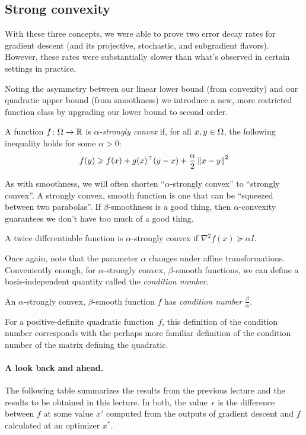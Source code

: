 \subsection{Strong convexity}

With these three concepts, we were able to prove two error decay rates for
gradient descent (and its projective, stochastic, and subgradient flavors).
However, these rates were substantially slower than what's observed in certain
settings in practice.

Noting the asymmetry between our linear lower bound (from convexity) and our
quadratic upper bound (from smoothness) we introduce a new, more restricted
function class by upgrading our lower bound to second order.

\begin{definition}
A function $f\colon\Omega\to\mathbb{R}$
is \emph{$\alpha$-strongly convex}
if, for all $x,y\in\Omega$,
the following inequality holds
for some $\alpha>0$:
\[
f(y) \geqslant f(x) + g(x)^\top(y-x) + \frac{\alpha}{2}\left\lVert x-y\right\rVert^2
\]
\end{definition}

As with smoothness, we will often shorten ``$\alpha$-strongly convex'' to
``strongly convex''.  A strongly convex, smooth function is one that can be
``squeezed between two parabolas''.  If $\beta$-smoothness is a good thing, then
$\alpha$-convexity guarantees we don't have too much of a good thing.

A twice differentiable function is $\alpha$-strongly convex if $\nabla^2f(x)
\succeq \alpha I$.

Once again, note that the parameter $\alpha$ changes under affine
transformations.  Conveniently enough, for $\alpha$-strongly convex,
$\beta$-smooth functions, we can define a basis-independent quantity called the
\emph{condition number}.

\begin{definition}
An $\alpha$-strongly convex, $\beta$-smooth function $f$
has \emph{condition number} $\frac{\beta}{\alpha}$.
\end{definition}

For a positive-definite quadratic function~$f$, this definition of the condition
number corresponds with the perhaps more familiar definition of the condition
number of the matrix defining the quadratic.

\paragraph{A look back and ahead.}
%
The following table summarizes the results from the previous lecture and the
results to be obtained in this lecture.  In both, the value~$\epsilon$ is the
difference between $f$ at some value $x'$ computed from the outputs of gradient
descent and $f$ calculated at an optimizer $x^*$.

